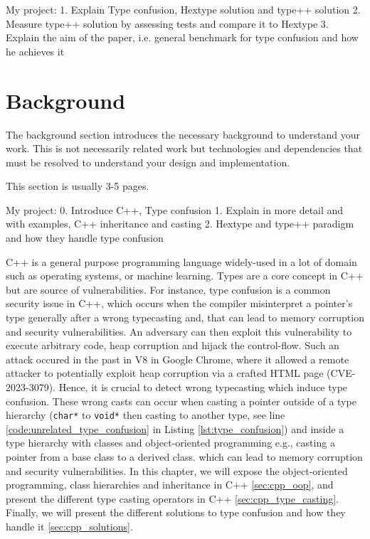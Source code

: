 \documentclass[a4paper,11pt,oneside]{report}
\begin{document}
My project: 
1. Explain Type confusion, Hextype solution and type++ solution
2. Measure type++ solution by assessing tests and compare it to Hextype
3. Explain the aim of the paper, i.e. general benchmark for type confusion and how he achieves it

\chapter{Background}

The background section introduces the necessary background to understand your
work. This is not necessarily related work but technologies and dependencies
that must be resolved to understand your design and implementation.

This section is usually 3-5 pages.

My project:
0. Introduce C++, Type confusion
1. Explain in more detail and with examples, C++ inheritance and casting
2. Hextype and type++ paradigm and how they handle type confusion

C++ is a general purpose programming language widely-used in a lot of domain such as operating systems, 
or machine learning. Types are a core concept in C++ but are source of vulnerabilities. For instance, type confusion 
is a common security issue in C++, which occurs when the compiler misinterpret a pointer's type generally after a wrong typecasting and,
that can lead to memory corruption and security vulnerabilities. An adversary can then exploit this vulnerability to execute arbitrary code, heap corruption and hijack the control-flow.
Such an attack occured in the past in V8 in Google Chrome, where it allowed a remote attacker to potentially exploit
heap corruption via a crafted HTML page (CVE-2023-3079). Hence, it is crucial to detect wrong typecasting which induce type confusion. 
These wrong casts can occur when casting a pointer outside of a type hierarchy (\texttt{char*} to \texttt{void*} then casting to another type, see line \ref{code:unrelated_type_confusion} in Listing \autoref{lst:type_confusion}) 
and inside a type hierarchy with classes and object-oriented programming e.g., casting a pointer from a base class to a derived class. 
which can lead to memory corruption and security vulnerabilities. In this chapter, we will
expose the object-oriented programming, class hierarchies and inheritance in C++ \autoref{sec:cpp_oop}, 
and present the different type casting operators in C++ \autoref{sec:cpp_type_casting}. 
Finally, we will present the different solutions to type confusion and how they handle it \autoref{sec:cpp_solutions}.
\end{document}
